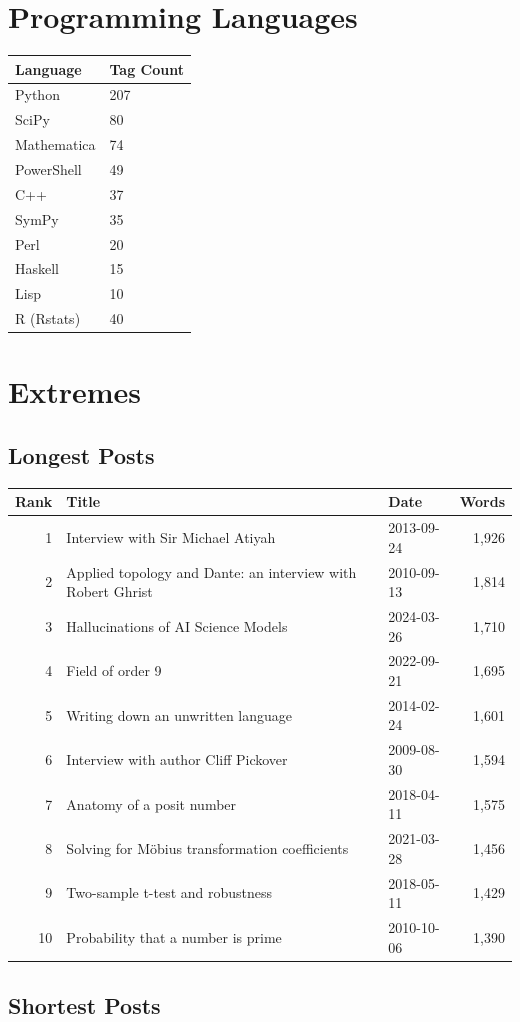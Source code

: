 \bigskip

\section*{Programming Languages}

\begin{longtable}{l p{5.5cm}}
\toprule
\textbf{Language} & \textbf{Tag Count} \tabularnewline
\midrule
Python & 207 \tabularnewline
SciPy & 80 \tabularnewline
Mathematica & 74 \tabularnewline
PowerShell & 49 \tabularnewline
C++ & 37 \tabularnewline
SymPy & 35 \tabularnewline
Perl & 20 \tabularnewline
Haskell & 15 \tabularnewline
Lisp & 10 \tabularnewline
R (Rstats) & 40 \tabularnewline
\bottomrule
\end{longtable}

\bigskip

\section*{Extremes}

\subsection*{Longest Posts}

\begin{longtable}{r p{4.5cm} l r}
\toprule
\textbf{Rank} & \textbf{Title} & \textbf{Date} & \textbf{Words} \tabularnewline
\midrule
1 & Interview with Sir Michael Atiyah & 2013-09-24 & 1,926 \tabularnewline
2 & Applied topology and Dante: an interview with Robert Ghrist & 2010-09-13 & 1,814 \tabularnewline
3 & Hallucinations of AI Science Models & 2024-03-26 & 1,710 \tabularnewline
4 & Field of order 9 & 2022-09-21 & 1,695 \tabularnewline
5 & Writing down an unwritten language & 2014-02-24 & 1,601 \tabularnewline
6 & Interview with author Cliff Pickover & 2009-08-30 & 1,594 \tabularnewline
7 & Anatomy of a posit number & 2018-04-11 & 1,575 \tabularnewline
8 & Solving for Möbius transformation coefficients & 2021-03-28 & 1,456 \tabularnewline
9 & Two-sample t-test and robustness & 2018-05-11 & 1,429 \tabularnewline
10 & Probability that a number is prime & 2010-10-06 & 1,390 \tabularnewline
\bottomrule
\end{longtable}

\subsection*{Shortest Posts}

